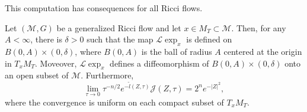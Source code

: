 This computation has consequences for all Ricci flows.

\begin{proposition}\label{prop:reduced-volume-integrand-limit}
\label{Jlimit}

Let $({\mathcal M},G)$ be a generalized Ricci flow and let $x\in M_T\subset
{\mathcal M}$. Then, for any $A<\infty$, there is $\delta>0$ such that the map
${\mathcal L}\exp_x$ is defined on $B(0,A)\times (0,\delta)$, where
$B(0,A)$ is the ball of radius $A$ centered at the origin in $T_xM_T$.
Moveover, ${\mathcal L}\exp_x$ defines a diffeomorphism of $B(0,A)\times
(0,\delta)$ onto an open subset of ${\mathcal M}$. Furthermore,
$$\lim_{\tau\rightarrow 0}\tau^{-n/2}e^{-\tilde l(Z,\tau)}{\mathcal J}(Z,\tau)=2^ne^{-|Z|^2},$$
where the convergence is uniform on each compact subset of $T_xM_T$.
\end{proposition}


